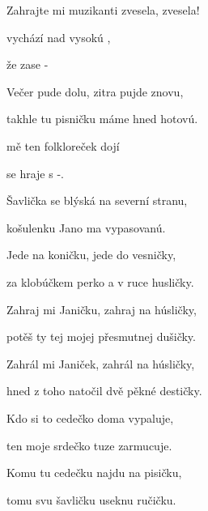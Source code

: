 

Zahrajte mi muzikanti zvesela, zvesela!

\zs
{} vychází nad vysokú ,

 že   zase -

Večer pude dolu, zitra pujde znovu,

takhle tu pisničku máme hned hotovú.
\ks

\zr
{} mě ten folkloreček {do}{jí}

 se hraje   s -.
\kr

\zs
Šavlička se blýská na severní stranu,

košulenku Jano ma vypasovanú.

Jede na koničku, jede do vesničky,

za klobúčkem perko a v ruce husličky.
\ks

\zr  \kr

\zs
Zahraj mi Janičku, zahraj na húsličky,

potěš ty tej mojej přesmutnej dušičky.

Zahrál mi Janiček, zahrál na húsličky,

hned z toho natočil dvě pěkné destičky.

\ks

\zr  \kr

\zs
Kdo si to cedečko doma vypaluje,

ten moje srdečko tuze zarmucuje.

Komu tu cedečku najdu na pisičku,

tomu svu šavličku useknu ručičku.
\ks

\zr  \kr

\kp







